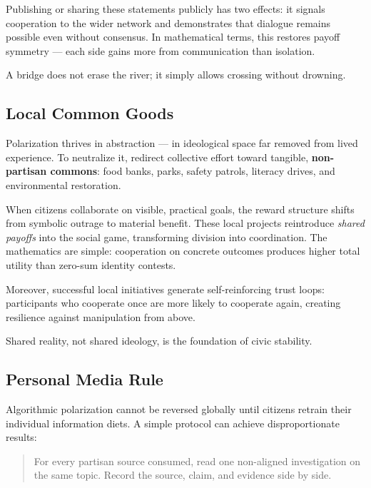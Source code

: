 \documentclass[12pt,twoside]{book}
\begin{document}
Publishing or sharing these statements publicly has two effects:  
it signals cooperation to the wider network and demonstrates that dialogue remains possible even without consensus.  
In mathematical terms, this restores payoff symmetry --- each side gains more from communication than isolation.  \\

\begin{keyidea}
A bridge does not erase the river; it simply allows crossing without drowning.
\end{keyidea}

\subsection*{Local Common Goods}

Polarization thrives in abstraction --- in ideological space far removed from lived experience.  
To neutralize it, redirect collective effort toward tangible, \textbf{non-partisan commons}: food banks, parks, safety patrols, literacy drives, and environmental restoration.  

When citizens collaborate on visible, practical goals, the reward structure shifts from symbolic outrage to material benefit.  
These local projects reintroduce \emph{shared payoffs} into the social game, transforming division into coordination.  
The mathematics are simple: cooperation on concrete outcomes produces higher total utility than zero-sum identity contests.

Moreover, successful local initiatives generate self-reinforcing trust loops:  
participants who cooperate once are more likely to cooperate again, creating resilience against manipulation from above.  \\

\begin{keyidea}
Shared reality, not shared ideology, is the foundation of civic stability.
\end{keyidea}

\subsection*{Personal Media Rule}

Algorithmic polarization cannot be reversed globally until citizens retrain their individual information diets.  
A simple protocol can achieve disproportionate results:  
\begin{quote}
For every partisan source consumed, read one non-aligned investigation on the same topic.  
Record the source, claim, and evidence side by side.
\end{quote}
\end{document}
